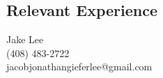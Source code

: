 \documentclass[12pt]{article}
\begin{document}
\begin{multicols}{2}
  \section*{Relevant Experience}
  \columnbreak

  \begin{Large}
    \begin{flushright}
      {Jake Lee\\(408) 483-2722\\
      jacobjonathangieferlee@gmail.com}
    \end{flushright}
  \end{Large}

\end{multicols}
  
\end{document}
